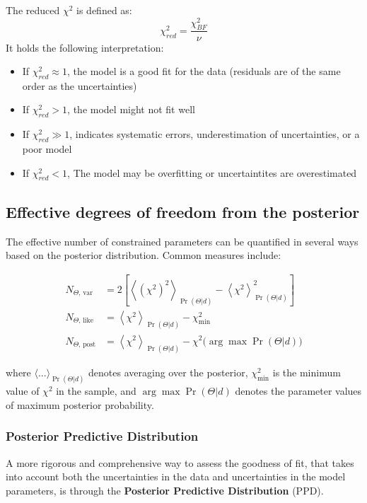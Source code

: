 The reduced $\chi^2$ is defined as:
$$
\chi^2_{red} = \dfrac{\chi^2_{BF}}{\nu}
$$
It holds the following interpretation:
\begin{itemize}
    \item If $\chi^2_{red} \approx 1$, the model is a good fit for the data (residuals are of the same order as the uncertainties)
    \item If $\chi^2_{red} > 1$, the model might not fit well
    \item If $\chi^2_{red} \gg 1$, indicates systematic errors, underestimation of uncertainties, or a poor model
    \item If $\chi^2_{red} < 1$, The model may be overfitting or uncertaintites are overestimated
\end{itemize}

\subsection{Effective degrees of freedom from the posterior}

The effective number of constrained parameters can be quantified in several ways based on the posterior distribution. Common measures include:

\begin{align*}
N_{\Theta,\,\mathrm{var}} &= 2 \left[ \left\langle (\chi^2)^2 \right\rangle_{\Pr(\Theta|d)} - \left\langle \chi^2 \right\rangle_{\Pr(\Theta|d)}^2 \right] \\[1em]
N_{\Theta,\,\mathrm{like}} &= \left\langle \chi^2 \right\rangle_{\Pr(\Theta|d)} - \chi^2_{\min} \\[1em]
N_{\Theta,\,\mathrm{post}} &= \left\langle \chi^2 \right\rangle_{\Pr(\Theta|d)} - \chi^2 \big(\arg\max \Pr(\Theta|d)\big)
\end{align*}

where $\langle ... \rangle_{\Pr(\Theta|d)}$ denotes averaging over the posterior, $\chi^2_{\min}$ is the minimum value of $\chi^2$ in the sample, and $\arg\max \Pr(\Theta|d)$ denotes the parameter values of maximum posterior probability.

\subsubsection{Posterior Predictive Distribution}

A more rigorous and comprehensive way to assess the goodness of fit, that takes into account both the uncertainties in the data and uncertainties in the model parameters, is through the \textbf{Posterior Predictive Distribution} (PPD).


